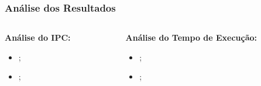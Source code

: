 \documentclass{beamer}
\begin{document}
    \begin{frame}
        \frametitle{Análise dos Resultados}

        \begin{columns}
            \begin{column}{0.5\textwidth}
                \begin{center}
                    \large
                    \textbf{Análise do IPC:}
                \end{center}
                \begin{itemize}
                    \item ;
                    \item ;
                \end{itemize}
            \end{column}

            \begin{column}{0.5\textwidth}
                \begin{center}
                    \large
                    \textbf{Análise do Tempo de Execução:}
                \end{center}
                \begin{itemize}
                    \item ;
                    \item ;
                \end{itemize}
            \end{column}
        \end{columns}
    \end{frame}
\end{document}
